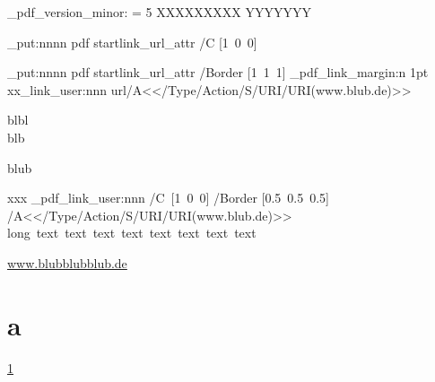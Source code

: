 \documentclass{article}
\begin{document}
\makeatletter%
\ExplSyntaxOn

\ifnum \driver_pdf_version_minor: = 5 XXXXXXXXX \else YYYYYYY\fi


\hook_put:nnnn
     { pdf }
     { startlink_url_attr }
     { /C }
     { [1~0~0] }

\hook_put:nnnn
       { pdf }
       { startlink_url_attr }
       { /Border }
       { [1~1~1] }
\driver_pdf_link_margin:n {1pt}
xx\pdf_link_user:nnn {url}{/A<</Type/Action/S/URI/URI(www.blub.de)>>}{blbl\\blb\par blub}

\par\bigskip
xxx
\driver_pdf_link_user:nnn
 {/C~[1~0~0]
 /Border [0.5~0.5~0.5]}
 {/A<</Type/Action/S/URI/URI(www.blub.de)>>}
 {long~text~text~text~text~text~text~text~text}

\url{www.blubblubblub.de}
\section{a}\label{a}
\ref{a}
\ExplSyntaxOff
{}
\end{document}
